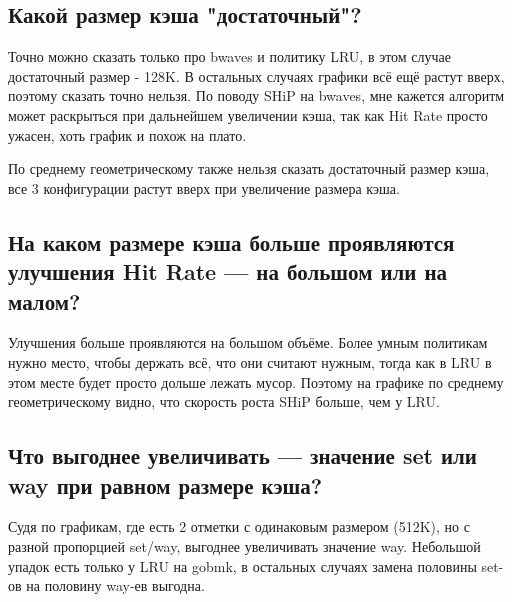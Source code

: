 \documentclass[12pt]{extarticle}
\begin{document}
\subsection{Какой размер кэша "достаточный"?}

Точно можно сказать только про bwaves и политику LRU, в этом случае достаточный размер - 128K. В остальных случаях графики всё ещё растут вверх, поэтому сказать точно нельзя. По поводу SHiP на bwaves, мне кажется алгоритм может раскрыться при дальнейшем увеличении кэша, так как Hit Rate просто ужасен, хоть график и похож на плато.

По среднему геометрическому также нельзя сказать достаточный размер кэша, все 3 конфигурации растут вверх при увеличение размера кэша.

\subsection{На каком размере кэша больше проявляются улучшения Hit Rate — на большом или на малом?}

Улучшения больше проявляются на большом объёме. Более умным политикам нужно место, чтобы держать всё, что они считают нужным, тогда как в LRU в этом месте будет просто дольше лежать мусор. Поэтому на графике по среднему геометрическому видно, что скорость роста SHiP больше, чем у LRU.

\subsection{Что выгоднее увеличивать — значение set или way при равном размере кэша?}

Судя по графикам, где есть 2 отметки с одинаковым размером (512K), но с разной пропорцией set/way, выгоднее увеличивать значение way. Небольшой упадок есть только у LRU на gobmk, в остальных случаях замена половины set-ов на половину way-ев выгодна.
\end{document}
